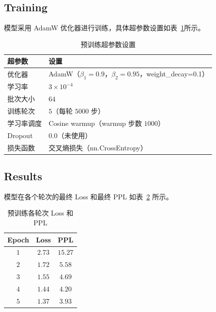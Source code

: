 \documentclass{article}
\begin{document}
\subsection{Training}

模型采用 AdamW 优化器进行训练，具体超参数设置如表~\ref{tab:pretrain_config}所示。

\begin{table}[htbp]
  \centering
  \caption{预训练超参数设置}
  \label{tab:pretrain_config}
  \begin{tabular}{ll}
    \toprule
    超参数 & 设置 \\
    \midrule
    优化器 & AdamW（$\beta_1=0.9$，$\beta_2=0.95$，weight\_decay=0.1） \\
    学习率 & $3\times 10^{-4}$ \\
    批次大小 & $64$ \\
    训练轮次 & $5$（每轮 $5000$ 步） \\
    学习率调度 & Cosine warmup（warmup 步数 $1000$） \\
    Dropout & $0.0$（未使用） \\
    损失函数 & 交叉熵损失（nn.CrossEntropy） \\
    \bottomrule
  \end{tabular}
\end{table}

\subsection{Results}

模型在各个轮次的最终 Loss 和最终 PPL 如表~\ref{tab:pretrain_results} 所示。

\begin{table}[htbp]
  \centering
  \caption{预训练各轮次 Loss 和 PPL}
  \label{tab:pretrain_results}
  \begin{tabular}{ccc}
    \toprule
    Epoch & Loss & PPL \\
    \midrule
    $1$   & $2.73$          & $15.27$         \\
    $2$   & $1.72$          & $5.58$          \\
    $3$   & $1.55$          & $4.69$          \\
    $4$   & $1.44$          & $4.20$          \\
    $5$   & $\boldsymbol{1.37}$ & $\boldsymbol{3.93}$ \\
    \bottomrule
  \end{tabular}
\end{table}
\end{document}
